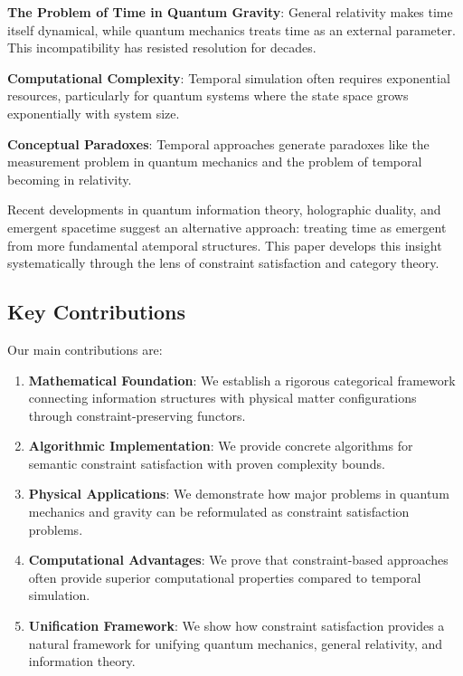 \documentclass[11pt]{article}
\theoremstyle{definition}
\begin{document}
\textbf{The Problem of Time in Quantum Gravity}: General relativity makes time itself dynamical, while quantum mechanics treats time as an external parameter. This incompatibility has resisted resolution for decades.

\textbf{Computational Complexity}: Temporal simulation often requires exponential resources, particularly for quantum systems where the state space grows exponentially with system size.

\textbf{Conceptual Paradoxes}: Temporal approaches generate paradoxes like the measurement problem in quantum mechanics and the problem of temporal becoming in relativity.

Recent developments in quantum information theory, holographic duality, and emergent spacetime suggest an alternative approach: treating time as emergent from more fundamental atemporal structures. This paper develops this insight systematically through the lens of constraint satisfaction and category theory.

\subsection{Key Contributions}

Our main contributions are:

\begin{enumerate}
\item \textbf{Mathematical Foundation}: We establish a rigorous categorical framework connecting information structures with physical matter configurations through constraint-preserving functors.

\item \textbf{Algorithmic Implementation}: We provide concrete algorithms for semantic constraint satisfaction with proven complexity bounds.

\item \textbf{Physical Applications}: We demonstrate how major problems in quantum mechanics and gravity can be reformulated as constraint satisfaction problems.

\item \textbf{Computational Advantages}: We prove that constraint-based approaches often provide superior computational properties compared to temporal simulation.

\item \textbf{Unification Framework}: We show how constraint satisfaction provides a natural framework for unifying quantum mechanics, general relativity, and information theory.
\end{enumerate}
\end{document}
